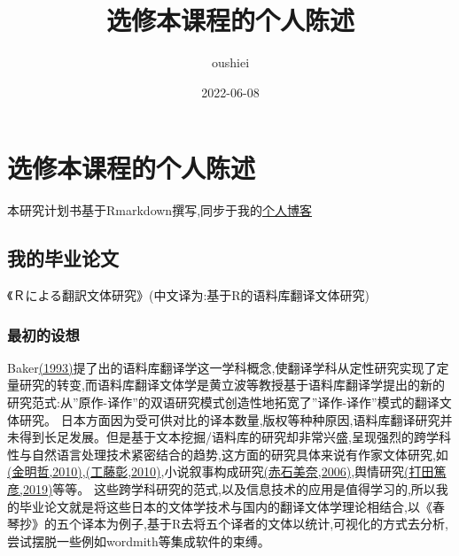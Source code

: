 \documentclass[
]{article}
\title{选修本课程的个人陈述}
\author{oushiei}
\date{2022-06-08}
\begin{document}
\maketitle

\hypertarget{ux9009ux4feeux672cux8bfeux7a0bux7684ux4e2aux4ebaux9648ux8ff0}{%
\section{选修本课程的个人陈述}\label{ux9009ux4feeux672cux8bfeux7a0bux7684ux4e2aux4ebaux9648ux8ff0}}

本研究计划书基于Rmarkdown撰写,同步于我的\href{https://oushiei.netlify.app/}{个人博客}

\hypertarget{ux6211ux7684ux6bd5ux4e1aux8bbaux6587}{%
\subsection{我的毕业论文}\label{ux6211ux7684ux6bd5ux4e1aux8bbaux6587}}

《Ｒによる翻訳文体研究》(中文译为:基于R的语料库翻译文体研究)

\hypertarget{ux6700ux521dux7684ux8bbeux60f3}{%
\subsubsection{最初的设想}\label{ux6700ux521dux7684ux8bbeux60f3}}

Baker\href{https://www.bing.com/search?q=Corpus+Linguistics+and+Translation+Studies+\%E2\%80\%94+Implications+and+Applications\&qs=n\&form=QBRE\&sp=-1\&pq=\&sc=0-0\&sk=\&cvid=3181E4590024439A9783249BD00EBF33}{(1993)}提了出的语料库翻译学这一学科概念,使翻译学科从定性研究实现了定量研究的转变,而语料库翻译文体学是黄立波等教授基于语料库翻译学提出的新的研究范式:从''原作-译作''的双语研究模式创造性地拓宽了''译作-译作''模式的翻译文体研究。
日本方面因为受可供对比的译本数量,版权等种种原因,语料库翻译研究并未得到长足发展。但是基于文本挖掘/语料库的研究却非常兴盛,呈现强烈的跨学科性与自然语言处理技术紧密结合的趋势,这方面的研究具体来说有作家文体研究,如\href{https://www.cis.doshisha.ac.jp/staff/jin/}{(金明哲,2010)},\href{https://cir.nii.ac.jp/crid/1390282679401094016}{(工藤彰,2010)},小说叙事构成研究\href{https://cir.nii.ac.jp/crid/1390282680082974080}{(赤石美奈,2006)},舆情研究\href{https://cir.nii.ac.jp/crid/1390285697600187520}{(打田篤彦,2019)}等等。
这些跨学科研究的范式,以及信息技术的应用是值得学习的,所以我的毕业论文就是将这些日本的文体学技术与国内的翻译文体学理论相结合,以《春琴抄》的五个译本为例子,基于R去将五个译者的文体以统计,可视化的方式去分析,尝试摆脱一些例如wordmith等集成软件的束缚。
\end{document}
